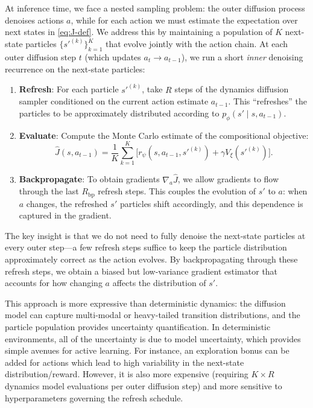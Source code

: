 \documentclass{article}
\theoremstyle{plain}
\theoremstyle{definition}
\theoremstyle{remark}
\begin{document}
At inference time, we face a nested sampling problem: the outer diffusion process denoises actions $a$, while for each action we must estimate the expectation over next states in \cref{eq:J-def}.
We address this by maintaining a population of $K$ next-state particles $\{s'^{(k)}\}_{k=1}^K$ that evolve jointly with the action chain.
At each outer diffusion step $t$ (which updates $a_t \to a_{t-1}$), we run a short \emph{inner} denoising recurrence on the next-state particles:
\begin{enumerate}
  \item \textbf{Refresh}: For each particle $s'^{(k)}$, take $R$ steps of the dynamics diffusion sampler conditioned on the current action estimate $a_{t-1}$. This ``refreshes'' the particles to be approximately distributed according to $p_\phi(s'\mid s, a_{t-1})$.
  \item \textbf{Evaluate}: Compute the Monte Carlo estimate of the compositional objective:
  \begin{equation}
    \hat{J}(s,a_{t-1}) = \frac{1}{K}\sum_{k=1}^K \bigl[r_\psi(s,a_{t-1},s'^{(k)}) + \gamma V_\xi(s'^{(k)})\bigr].
  \end{equation}
  \item \textbf{Backpropagate}: To obtain gradients $\nabla_a \hat{J}$, we allow gradients to flow through the last $R_{\text{bp}}$ refresh steps. This couples the evolution of $s'$ to $a$: when $a$ changes, the refreshed $s'$ particles shift accordingly, and this dependence is captured in the gradient.
\end{enumerate}

The key insight is that we do not need to fully denoise the next-state particles at every outer step---a few refresh steps suffice to keep the particle distribution approximately correct as the action evolves.
By backpropagating through these refresh steps, we obtain a biased but low-variance gradient estimator that accounts for how changing $a$ affects the distribution of $s'$.

This approach is more expressive than deterministic dynamics: the diffusion model can capture multi-modal or heavy-tailed transition distributions, and the particle population provides uncertainty quantification. In deterministic environments, all of the uncertainty is due to model uncertainty, which provides simple avenues for active learning. For instance, an exploration bonus can be added for actions which lead to high variability in the next-state distribution/reward.
However, it is also more expensive (requiring $K \times R$ dynamics model evaluations per outer diffusion step) and more sensitive to hyperparameters governing the refresh schedule.
\end{document}
